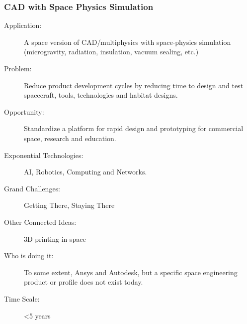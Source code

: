    \subsubsection{CAD with Space Physics Simulation} 
 \begin{description}  \item[Application:] A space version of \gls{CAD}/multiphysics with space-physics simulation  (microgravity, radiation, insulation, vacuum sealing, etc.)
 
   \item[Problem:] Reduce product development cycles by reducing time to  design and test spacecraft, tools, technologies and habitat designs.
 
   \item[Opportunity:] Standardize a platform for rapid design and  prototyping for commercial space, research and education.
 
   \item[Exponential Technologies:] AI, Robotics, Computing and Networks.
 
   \item[Grand Challenges:] Getting There, Staying There
 
   \item[Other Connected Ideas:] 3D printing in-space
 
 
   \item[Who is doing it:] To  some extent, Ansys and Autodesk, but a specific space engineering  product or profile does not exist today.
 
   \item[Time Scale:] <5 years

      \end{description}
  
